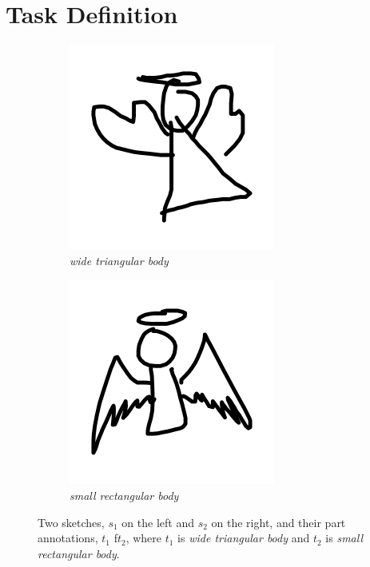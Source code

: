 
     

\section{Task Definition} \label{modeling.task.def}
\begin{figure}[!htb]
\begin{subfigure}{0.5\textwidth}
    \centering
    \includegraphics[width=0.5\linewidth]{modeling/angel340.png}
    \caption{\textit{wide triangular body}}
    \label{modeling.task.sketches.1}  
\end{subfigure}
\begin{subfigure}{0.5\textwidth}
    \centering
    \includegraphics[width=0.5\linewidth]{modeling/angel389.png}   
    \caption{\textit{small rectangular body}}
    \label{modeling.task.sketches.2}  
\end{subfigure}
\caption{Two sketches, $s_1$ on the left and $s_2$ on the right, and their part annotations, $t_1$ f$t_2$, where $t_1$ is \textit{wide triangular body} and $t_2$ is \textit{small rectangular body}.}
\label{modeling.task.sketches}
\end{figure}

